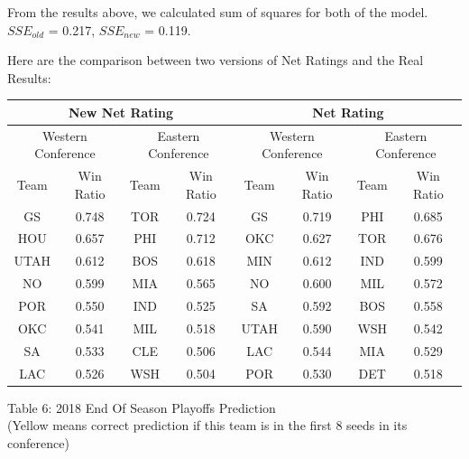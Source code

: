 \documentclass[11pt]{article}
\begin{document}
From the results above, we calculated sum of squares for both of the model. $SSE_{old}$ = 0.217, $SSE_{new}$ = 0.119.

Here are the comparison between two versions of Net Ratings and the Real Results:\\

\begin{center}
\begin{tabular}{|c|c|c|c|c|c|c|c|}
\hline
\multicolumn{4}{|c|}{New Net Rating} &
\multicolumn{4}{c|}{Net Rating} \\
\hline
\multicolumn{2}{|c|}{Western Conference} &
\multicolumn{2}{c|}{Eastern Conference}&
\multicolumn{2}{c|}{Western Conference} &
\multicolumn{2}{c|}{Eastern Conference}\\

\hline
 Team& Win Ratio & Team & Win Ratio & Team & Win Ratio &Team & Win Ratio \\
\hline
\cellcolor{yellow} GS   & 0.748 & \cellcolor{yellow} TOR & 0.724 & \cellcolor{yellow} GS   & 0.719 & \cellcolor{yellow} PHI & 0.685\\
\hline
\cellcolor{yellow} HOU  & 0.657 & \cellcolor{yellow} PHI & 0.712 & \cellcolor{yellow} OKC  & 0.627 & \cellcolor{yellow} TOR & 0.676 \\
\hline
\cellcolor{yellow} UTAH & 0.612 & \cellcolor{yellow} BOS & 0.618 & \cellcolor{yellow} MIN  & 0.612 & \cellcolor{yellow} IND & 0.599\\
\hline
\cellcolor{yellow} NO   & 0.599 & \cellcolor{yellow} MIA & 0.565 & \cellcolor{yellow} NO   & 0.600 & \cellcolor{yellow} MIL & 0.572\\
\hline
\cellcolor{yellow} POR  & 0.550 & \cellcolor{yellow} IND & 0.525 & \cellcolor{yellow} SA   &  0.592 & \cellcolor{yellow} BOS & 0.558 \\
\hline
\cellcolor{yellow} OKC  & 0.541 & \cellcolor{yellow} MIL & 0.518 & \cellcolor{yellow} UTAH & 0.590 & \cellcolor{yellow} WSH & 0.542 \\
\hline
\cellcolor{yellow} SA   & 0.533 & \cellcolor{yellow} CLE & 0.506 & LAC &  0.544 & \cellcolor{yellow} MIA & 0.529\\
\hline
 LAC  & 0.526 & \cellcolor{yellow}  WSH & 0.504 &  \cellcolor{yellow} POR &  0.530 & DET & 0.518\\
\hline
\end{tabular}

\bigskip

Table 6: 2018 End Of Season Playoffs Prediction \\(Yellow means correct prediction if this team is in the first 8 seeds in its conference)
\end{center}
\end{document}
